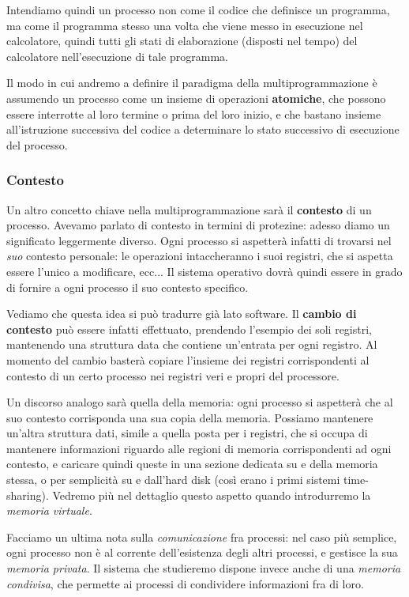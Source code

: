 \documentclass[a4paper,11pt]{article}
\begin{document}
Intendiamo quindi un processo non come il codice che definisce un programma, ma come il programma stesso una volta che viene messo in esecuzione nel calcolatore, quindi tutti gli stati di elaborazione (disposti nel tempo) del calcolatore nell'esecuzione di tale programma.

Il modo in cui andremo a definire il paradigma della multiprogrammazione è assumendo un processo come un insieme di operazioni \textbf{atomiche}, che possono essere interrotte al loro termine o prima del loro inizio, e che bastano insieme all'istruzione successiva del codice a determinare lo stato successivo di esecuzione del processo.

\subsubsection{Contesto}
Un altro concetto chiave nella multiprogrammazione sarà il \textbf{contesto} di un processo.
Avevamo parlato di contesto in termini di protezine: adesso diamo un significato leggermente diverso.
Ogni processo si aspetterà infatti di trovarsi nel \textit{suo} contesto personale: le operazioni intaccheranno i suoi registri, che si aspetta essere l'unico a modificare, ecc...
Il sistema operativo dovrà quindi essere in grado di fornire a ogni processo il suo contesto specifico.

Vediamo che questa idea si può tradurre già lato software.
Il \textbf{cambio di contesto} può essere infatti effettuato, prendendo l'esempio dei soli registri, mantenendo una struttura data che contiene un'entrata per ogni registro.
Al momento del cambio basterà copiare l'insieme dei registri corrispondenti al contesto di un certo processo nei registri veri e propri del processore.

Un discorso analogo sarà quella della memoria: ogni processo si aspetterà che al suo contesto corrisponda una sua copia della memoria.
Possiamo mantenere un'altra struttura dati, simile a quella posta per i registri, che si occupa di mantenere informazioni riguardo alle regioni di memoria corrispondenti ad ogni contesto, e caricare quindi queste in una sezione dedicata su e della memoria stessa, o per semplicità su e dall'hard disk (così erano i primi sistemi time-sharing).
Vedremo più nel dettaglio questo aspetto quando introdurremo la \textit{memoria virtuale}.

Facciamo un ultima nota sulla \textit{comunicazione} fra processi: nel caso più semplice, ogni processo non è al corrente dell'esistenza degli altri processi, e gestisce la sua \textit{memoria privata}.
Il sistema che studieremo dispone invece anche di una \textit{memoria condivisa}, che permette ai processi di condividere informazioni fra di loro.
\end{document}
